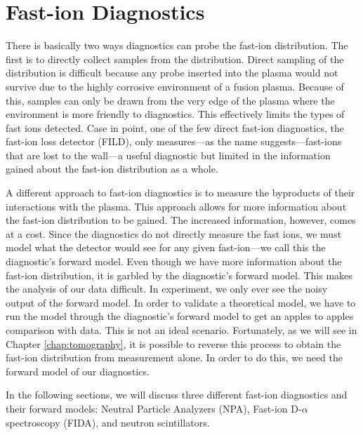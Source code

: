 \chapter{Fast-ion Diagnostics}\label{chap:diagnostics}
There is basically two ways diagnostics can probe the fast-ion distribution. The first is to directly collect samples from the distribution. Direct sampling of the distribution is difficult because any probe inserted into the plasma would not survive due to the highly corrosive environment of a fusion plasma. Because of this, samples can only be drawn from the very edge of the plasma where the environment is more friendly to diagnostics. This effectively limits the types of fast ions detected. Case in point, one of the few direct fast-ion diagnostics, the fast-ion loss detector (FILD), only measures---as the name suggests---fast-ions that are lost to the wall---a useful diagnostic but limited in the information gained about the fast-ion distribution as a whole.

A different approach to fast-ion diagnostics is to measure the byproducts of their interactions with the plasma. This approach allows for more information about the fast-ion distribution to be gained. The increased information, however, comes at a cost. Since the diagnostics do not directly measure the fast ions, we must model what the detector would see for any given fast-ion---we call this the diagnostic's forward model. Even though we have more information about the fast-ion distribution, it is garbled by the diagnostic's forward model. This makes the analysis of our data difficult. In experiment, we only ever see the noisy output of the forward model. In order to validate a theoretical model, we have to run the model through the diagnostic's forward model to get an apples to apples comparison with data. This is not an ideal scenario. Fortunately, as we will see in Chapter \ref{chap:tomography}, it is possible to reverse this process to obtain the fast-ion distribution from measurement alone. In order to do this, we need the forward model of our diagnostics.

In the following sections, we will discuss three different fast-ion diagnostics and their forward models: Neutral Particle Analyzers (NPA), Fast-ion D-$\alpha$ spectroscopy (FIDA), and neutron scintillators.

